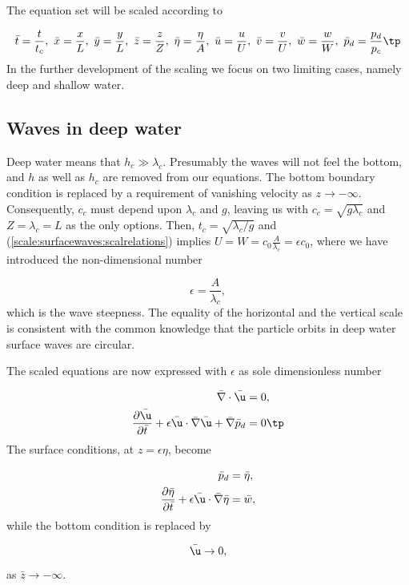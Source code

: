 \documentclass[graybox,envcountchap,sectrefs,final]{svmonodo}
\begin{document}
The equation set will be scaled according to

\[
\bar t=\frac{t}{t_c},\ \bar x=\frac{x}{L},\ \bar y =\frac{y}{L},\ \bar z =\frac{z}{Z},\ \bar \eta=\frac{\eta}{A},\ \bar u=\frac{u}{U},\ \bar v=\frac{v}{U},\ \bar w=\frac{w}{W},\ \bar p_d=\frac{p_d}{p_c}\tp
\]
In the further development of the scaling
we focus on two limiting cases, namely deep and shallow water.

\subsection{Waves in deep  water}

Deep water means that $h_c\gg\lambda_c$. Presumably the waves will not
feel the bottom, and $h$ as well as $h_c$ are removed from our
equations. The bottom boundary condition is replaced by a requirement
of vanishing velocity as $z\rightarrow -\infty$. Consequently, $c_c$
must depend upon $\lambda_c$ and $g$, leaving us with
$c_c=\sqrt{g\lambda_c}$ and $Z=\lambda_c=L$ as the only options.
Then, $t_c=\sqrt{\lambda_c/g}$ and
(\ref{scale:surfacewaves:scalrelations}) implies
$U=W=c_0\frac{A}{\lambda_c}=\epsilon c_0$, where we have introduced
the non-dimensional number

\[\epsilon=\frac{A}{\lambda_c},\]
which is the wave steepness. The equality of the horizontal and the vertical
scale is consistent with the common knowledge that the particle orbits in
deep water surface waves are circular.

The scaled equations are now expressed with $\epsilon$ as sole dimensionless
number

\begin{align}
\bar \nabla\cdot\bar\u &=0,
\label{scale:surfacewaves:cont:}\\ 
\frac{\partial\bar\u}{\partial \bar t} + \epsilon\bar \u\cdot\bar\nabla\bar\u + \bar\nabla \bar p_d&=0\tp
\label{scale:surfacewave:u:s}
\end{align}
The surface conditions, at $z=\epsilon \eta$, become

\begin{align}
\bar p_d &=\bar \eta,
\label{scale:surfacewaves:dynsurf:s}\\ 
\frac{\partial\bar\eta}{\partial \bar t} + \epsilon \bar \u\cdot\bar\nabla\bar\eta &=\bar w,
\label{scale:surfacewave:kinsurf:s}
\end{align}
while the bottom condition is replaced by

\begin{equation}
\label{scale:surfacewave:kinbott2}
\bar\u \rightarrow 0,
\end{equation}
as $\bar z \rightarrow -\infty$.
\end{document}
